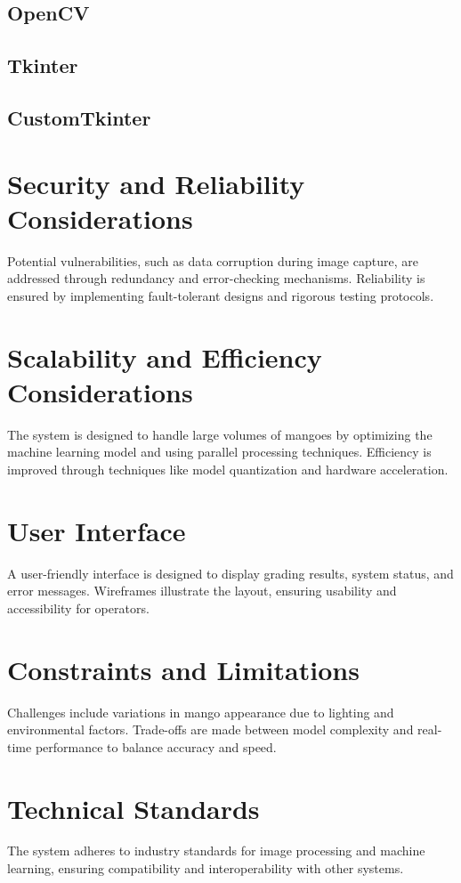\subsection{OpenCV}

\subsection{Tkinter}

\subsection{CustomTkinter}

\section{Security and Reliability Considerations}
Potential vulnerabilities, such as data corruption during image capture, are addressed through redundancy and error-checking mechanisms. Reliability is ensured by implementing fault-tolerant designs and rigorous testing protocols.

\section{Scalability and Efficiency Considerations}
The system is designed to handle large volumes of mangoes by optimizing the machine learning model and using parallel processing techniques. Efficiency is improved through techniques like model quantization and hardware acceleration.

\section{User Interface}
A user-friendly interface is designed to display grading results, system status, and error messages. Wireframes illustrate the layout, ensuring usability and accessibility for operators.

\section{Constraints and Limitations}
Challenges include variations in mango appearance due to lighting and environmental factors. Trade-offs are made between model complexity and real-time performance to balance accuracy and speed.

\section{Technical Standards}
The system adheres to industry standards for image processing and machine learning, ensuring compatibility and interoperability with other systems.

